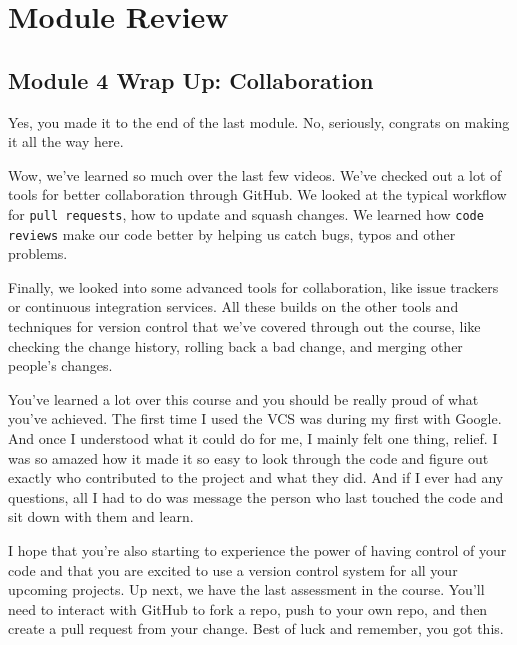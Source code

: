 \section{Module Review}

	\subsection{Module 4 Wrap Up: Collaboration}
	
	
	Yes, you made it to the end of the last module. No, seriously, congrats on making it all the way here.
	
	Wow, we've learned so much over the last few videos. We've checked out a lot of tools for better collaboration through GitHub. We looked at the typical workflow for \texttt{pull requests}, how to update and squash changes. 
	We learned how \texttt{code reviews} make our code better by helping us catch bugs, typos and other problems.
	
	Finally, we looked into some advanced tools for collaboration, like issue trackers or continuous integration services. All these builds on the other tools and techniques for version control that we've covered through out the course, like checking the change history, rolling back a bad change, and merging other people's changes. 

	You've learned a lot over this course and you should be really proud of what you've achieved. The first time I used the VCS was during my first with Google. And once I understood what it could do for me, I mainly felt one thing, relief. I was so amazed how it made it so easy to look through the code and figure out exactly who contributed to the project and what they did. And if I ever had any questions, all I had to do was message the person who last touched the code and sit down with them and learn. 
	
	I hope that you're also starting to experience the power of having control of your code and that you are excited to use a version control system for all your upcoming projects. Up next, we have the last assessment in the course. You'll need to interact with GitHub to fork a repo, push to your own repo, and then create a pull request from your change. Best of luck and remember, you got this.
